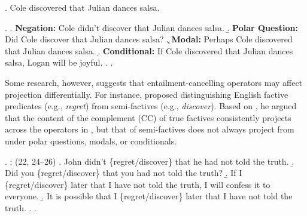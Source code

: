 \documentclass[a4paper,12pt,twoside]{article}
\begin{document}
    
    \ex.\label{ex:simple} Cole discovered that Julian dances salsa.

	\ex. \label{ex:family}
		\a. \label{ex:neg}
			{\bf Negation:} \hfill
			Cole didn't discover that Julian dances salsa.
		\b. \label{ex:q}
			{\bf Polar Question:} \hfill
			Did Cole discover that Julian dances salsa?
		\c. \label{ex:mod}
			{\bf Modal:} \hfill
			Perhaps Cole discovered that Julian dances salsa.
		\d. \label{ex:cond}
			{\bf Conditional:} \hfill
			If Cole discovered that Julian dances salsa, Logan will be joyful.
		\z.
	\z.

    Some research, however, suggests that entailment-cancelling operators may affect projection differentially. For instance, \citet{karttunen_observations_1971} proposed distinguishing English factive predicates (e.g., \textit{regret}) from semi-factives (e.g., \textit{discover}). Based on \Next, he argued that the content of the complement (CC) of true factives consistently projects across the operators in \Last, but that of semi-factives does not always project from under polar questions, modals, or conditionals.%

    \ex. \citealt{karttunen_observations_1971}: (22, 24--26)
        \a. John didn't \{regret/discover\} that he had not told the truth.
        \b. Did you \{regret/discover\} that you had not told the truth?
        \b. If I \{regret/discover\} later that I have not told the truth, I will confess it to everyone.
        \b. It is possible that I \{regret/discover\} later that I have not told the truth.
        \z.
    \z.
\end{document}
